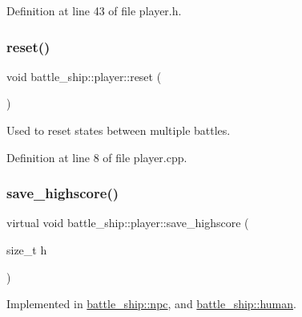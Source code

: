 Definition at line 43 of file player.\+h.

\mbox{\label{classbattle__ship_1_1player_ae21fefa953f6a3a0476cabfae7084bbf}} 
\subsubsection{\texorpdfstring{reset()}{reset()}}
{\footnotesize\ttfamily void battle\+\_\+ship\+::player\+::reset (\begin{DoxyParamCaption}{ }\end{DoxyParamCaption})}



Used to reset states between multiple battles. 



Definition at line 8 of file player.\+cpp.

\mbox{\label{classbattle__ship_1_1player_a928538249678aea5402f8c673671e995}} 
\subsubsection{\texorpdfstring{save\+\_\+highscore()}{save\_highscore()}}
{\footnotesize\ttfamily virtual void battle\+\_\+ship\+::player\+::save\+\_\+highscore (\begin{DoxyParamCaption}\item[{size\+\_\+t}]{h }\end{DoxyParamCaption})\hspace{0.3cm}{\ttfamily [pure virtual]}}



Implemented in \hyperlink{classbattle__ship_1_1npc_ab81843d30e5f8801a8fe479d44ead157}{battle\+\_\+ship\+::npc}, and \hyperlink{classbattle__ship_1_1human_a5b7e6cad4d1f187907a205b767a2fd7d}{battle\+\_\+ship\+::human}.

\mbox{\label{classbattle__ship_1_1player_a3110ec708fd8fc7e02a6e88a63d57d2f}} 
